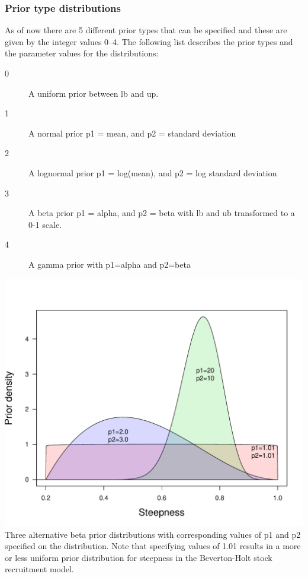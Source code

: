 \begin{multicols}{2}
\subsubsection{Prior type distributions}
As of now there are 5 different prior types that can be specified and these are given by the integer values 0--4.  The following list describes the prior types and the parameter values for the distributions:
\begin{description}
\item[0] A uniform prior between lb and up. 
\item[1] A normal prior p1 = mean, and p2 = standard deviation
\item[2] A lognormal prior p1 = log(mean), and p2 = log standard deviation
\item[3] A beta prior p1 = alpha, and p2 = beta with lb and ub transformed to a 0-1 scale.
\item[4] A gamma prior with p1=alpha and p2=beta
\end{description}

\begin{figurehere}
	\centering
	\includegraphics[width=\columnwidth]{iscamFigs/betaPriors.pdf}\\
	\caption{Three alternative beta prior distributions with corresponding values of p1 and p2 specified on the distribution.  Note that specifying values of 1.01 results in a more or less uniform prior distribution for steepness in the Beverton-Holt stock recruitment model.}\label{label}
\end{figurehere}


\end{multicols}

